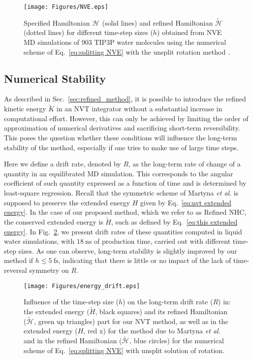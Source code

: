 \documentclass[
	aip,
	jcp,
	reprint,
]{revtex4-1}
\newcommand{\Ham}[1]{{\mathcal H}_\text{#1}}           %
\newcommand{\timestep}{h}
\newcommand{\refined}[1]{\widetilde{#1}}
\begin{document}
\begin{figure}
	\texttt{[image: Figures/NVE.eps]}
	\caption{Specified Hamiltonian $\Ham{}$ (solid lines) and refined Hamiltonian $\refined{\Ham{}}$ (dotted lines) for different time-step sizes ($\timestep$) obtained from NVE MD simulations of 903 TIP3P \cite{Jorgensen_1983} water molecules using the numerical scheme of Eq.~\eqref{eq:splitting NVE} with the unsplit rotation method \cite{Silveira_2017}.}
	\label{fig:nve}
\end{figure}

\subsection{Numerical Stability}

As described in Sec.~\ref{sec:refined_method}, it is possible to introduce the refined kinetic energy $\refined K$ in an NVT integrator without a substantial increase in computational effort.
However, this can only be achieved by limiting the order of approximation of numerical derivatives and sacrificing short-term reversibility.
This poses the question whether these conditions will influence the long-term stability of the method, especially if one tries to make use of large time steps.

Here we define a drift rate, denoted by $R$, as the long-term rate of change of a quantity in an equilibrated MD simulation.
This corresponds to the angular coefficient of such quantity expressed as a function of time and is determined by least-square regression.
Recall that the symmetric scheme of Martyna \textit{et al}. \cite{Martyna_1996} is supposed to preserve the extended energy $H$ given by Eq.~\eqref{eq:nvt extended energy}.
In the case of our proposed method, which we refer to as Refined NHC, the conserved extended energy is $\refined H$, such as defined by Eq.~\eqref{eq:this extended energy}.
In Fig.~\ref{fig:energy_drift}, we present drift rates of these quantities computed in liquid water simulations, with $18~\text{ns}$ of production time, carried out with different time-step sizes.
As one can observe, long-term stability is slightly improved by our method if $\timestep \le 5~\text{fs}$, indicating that there is little or no impact of the lack of time-reversal symmetry on $R$.

\begin{figure}
	\texttt{[image: Figures/energy\_drift.eps]}
	\caption{Influence of the time-step size ($\timestep$) on the long-term drift rate ($R$) in: the extended energy ($\refined{H}$, black squares) and its refined Hamiltonian ($\refined{\Ham{}}$, green up triangles) part for our NVT method, as well as in the extended energy ($H$, red x) for the method due to Martyna \textit{et al}. \cite{Martyna_1996} and in the refined Hamiltonian ($\refined{\Ham{}}$, blue circles) for the numerical scheme of Eq.~\eqref{eq:splitting NVE} with unsplit solution of rotation.}
	\label{fig:energy_drift}
\end{figure}
\end{document}
